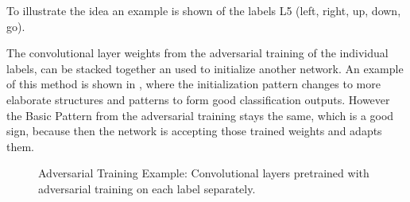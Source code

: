 To illustrate the idea an example is shown of the labels L5 (left, right, up, down, go).

The convolutional layer weights from the adversarial training of the individual labels, 
can be stacked together an used to initialize another network.
An example of this method is shown in , where the initialization pattern changes to more elaborate structures and patterns to form good classification outputs. 
However the Basic Pattern from the adversarial training stays the same, which is a good sign, because then the network is accepting those trained weights and adapts them.

\begin{figure}[!ht]
  \centering
    \quad
  \caption{Adversarial Training Example: Convolutional layers pretrained with adversarial training on each label separately.}
  \label{fig:ml_adv_example}
\end{figure}
\FloatBarrier
\noindent

